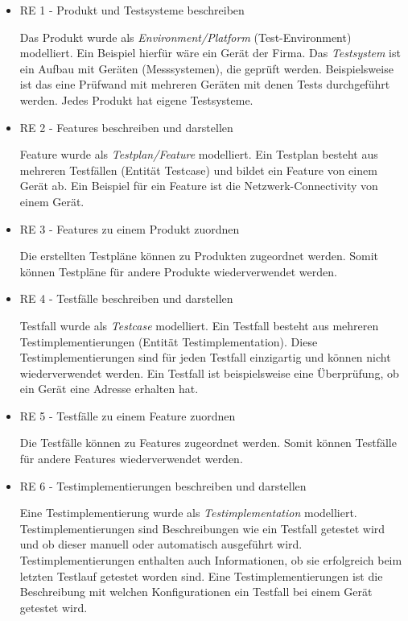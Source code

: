 \documentclass[a4paper, fontsize=11pt, parskip=half, twoside, headings=openright]{scrreprt}
\begin{document}
	\begin{itemize}
		\item RE 1 - Produkt und Testsysteme beschreiben
		
		Das Produkt wurde als \emph{Environment/Platform} (Test-Environment) modelliert.
		Ein Beispiel hierfür wäre ein Gerät der Firma.
		Das \emph{Testsystem} ist ein Aufbau mit Geräten (Messsystemen), die geprüft werden. 
		Beispielsweise ist das eine Prüfwand mit mehreren Geräten mit denen Tests durchgeführt werden.
		Jedes Produkt hat eigene Testsysteme.
		
		\item RE 2 - Features beschreiben und darstellen
		
		Feature wurde als \emph{Testplan/Feature} modelliert.
		Ein Testplan besteht aus mehreren Testfällen (Entität Testcase) und bildet ein Feature von einem Gerät ab.
		Ein Beispiel für ein Feature ist die Netzwerk-Connectivity von einem Gerät.
		
		\item RE 3 - Features zu einem Produkt zuordnen
		
		Die erstellten Testpläne können zu Produkten zugeordnet werden.
		Somit können Testpläne für andere Produkte wiederverwendet werden.
		
		\item RE 4 - Testfälle beschreiben und darstellen
		
		Testfall wurde als \emph{Testcase} modelliert.
	    Ein Testfall besteht aus mehreren Testimplementierungen (Entität Testimplementation).
	    Diese Testimplementierungen sind für jeden Testfall einzigartig und können nicht wiederverwendet werden. 
	    Ein Testfall ist beispielsweise eine Überprüfung, ob ein Gerät eine  Adresse erhalten hat.
		
		\item RE 5 - Testfälle zu einem Feature zuordnen
		
		Die Testfälle können zu Features zugeordnet werden.
		Somit können Testfälle für andere Features wiederverwendet werden.
		
		\item RE 6 - Testimplementierungen beschreiben und darstellen
		
		Eine Testimplementierung wurde als \emph{Testimplementation} modelliert.
		Testimplementierungen sind Beschreibungen wie ein Testfall getestet wird und ob dieser manuell oder automatisch ausgeführt wird.
		Testimplementierungen enthalten auch Informationen, ob sie erfolgreich beim letzten Testlauf getestet worden sind.
		Eine Testimplementierungen ist die Beschreibung mit welchen Konfigurationen ein Testfall bei einem Gerät getestet wird.
		

\end{itemize}
\end{document}
